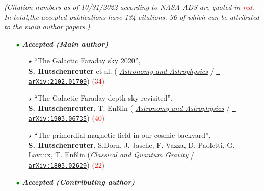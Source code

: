 \small\textit{(Citation numbers as of 10/31/2022 according to NASA ADS are quoted in \textcolor{red}{red}. In total,the accepted publications have 134 citations, 96 of which can be attributed to the main author papers.)}
\normalsize

\begin{itemize}

\vspace{10pt}
\item[\textcolor{Green}{$\bullet$}] \textit{\textbf{Accepted (Main author)}}
\vspace{10pt}

    \begin{itemize}
      \item[\textcolor{Black}{$\star$}]{``The Galactic Faraday sky 2020'', \\
      \textbf{S. Hutschenreuter} et al. ({\color{blue} \href{https://www.aanda.org/articles/aa/abs/2022/01/aa40486-21/aa40486-21.htmll}{\textit{Astronomy and Astrophysics}} /  \href{https://arxiv.org/abs/2102.01709}{\texttt{{\color{blue} arXiv:2102.01709}}}})
      \textcolor{red}{(34)}
      }

      \vspace{6pt}

      \item[\textcolor{Black}{$\star$}]{``The Galactic Faraday depth sky revisited'', \\
      \textbf{S. Hutschenreuter}, T. En{\ss}lin ({\color{blue} \href{https://www.aanda.org/articles/aa/full_html/2020/01/aa35479-19/aa35479-19.html}{\textit{Astronomy and Astrophysics}} /  \href{https://arxiv.org/abs/1903.06735}{\texttt{{\color{blue} arXiv:1903.06735}}}})
      \textcolor{red}{(40)}
      }

      \vspace{6pt}

      \item[\textcolor{Black}{$\star$}]{``The primordial magnetic field in our cosmic backyard'', \\
      \textbf{S. Hutschenreuter}, S.Dorn, J. Jasche, F. Vazza, D. Paoletti, G. Lavaux, T. En{\ss}lin (\href{https://iopscience.iop.org/article/10.1088/1361-6382/aacde0}{\color{blue}\textit{Classical and Quantum Gravity}} / \href{https://arxiv.org/abs/1803.02629}{\texttt{{\color{blue} arXiv:1803.02629}}})
      \textcolor{red}{(22)}
      }
    \end{itemize}

  \vspace{10pt}
  \item[\textcolor{Green}{$\bullet$}] \textit{\textbf{Accepted (Contributing author)}}
  \vspace{10pt}


\end{itemize}
